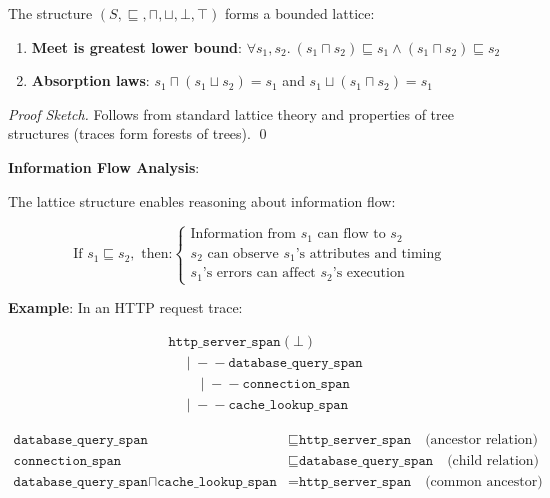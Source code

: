 \begin{theorem}
\label{thm:lattice}
The structure $(S, \sqsubseteq, \sqcap, \sqcup, \bot, \top)$ forms a bounded lattice:
\begin{enumerate}
\item \textbf{Meet is greatest lower bound}: $\forall s_1, s_2.\ (s_1 \sqcap s_2) \sqsubseteq s_1 \land (s_1 \sqcap s_2) \sqsubseteq s_2$
\item \textbf{Absorption laws}: $s_1 \sqcap (s_1 \sqcup s_2) = s_1$ and $s_1 \sqcup (s_1 \sqcap s_2) = s_1$
\end{enumerate}
\end{theorem}

\begin{proof}[Proof Sketch]
Follows from standard lattice theory and properties of tree structures (traces form forests of trees). \qed
\end{proof}

\textbf{Information Flow Analysis}:

The lattice structure enables reasoning about information flow:

\[
\text{If } s_1 \sqsubseteq s_2, \text{ then:}
\left\{\begin{array}{l}
\text{Information from } s_1 \text{ can flow to } s_2 \\
s_2 \text{ can observe } s_1\text{'s attributes and timing} \\
s_1\text{'s errors can affect } s_2\text{'s execution}
\end{array}\right.
\]

\textbf{Example}: In an HTTP request trace:

\begin{align*}
&\texttt{http\_server\_span} (\bot) \\
&\quad \mid\!\!\!-\!\!\!- \texttt{database\_query\_span} \\
&\quad\quad \mid\!\!\!-\!\!\!- \texttt{connection\_span} \\
&\quad \mid\!\!\!-\!\!\!- \texttt{cache\_lookup\_span}
\end{align*}

\begin{align*}
\texttt{database\_query\_span} &\sqsubseteq \texttt{http\_server\_span} \quad \text{(ancestor relation)} \\
\texttt{connection\_span} &\sqsubseteq \texttt{database\_query\_span} \quad \text{(child relation)} \\
\texttt{database\_query\_span} \sqcap \texttt{cache\_lookup\_span} &= \texttt{http\_server\_span} \quad \text{(common ancestor)}
\end{align*}

